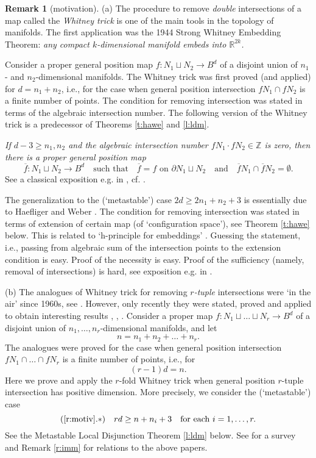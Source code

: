 \documentclass[12pt]{article}
\def\Z{{\mathbb Z}} \def\R{{\mathbb R}} \def\Q{{\mathbb Q}} \def\C{{\mathbb C}}
\theoremstyle{plain}
\theoremstyle{definition}
\newtheorem{Remark}[Theorem]{Remark}
\begin{document}
\begin{Remark}[motivation]\label{r:motiv}
(a) The procedure to remove {\it double} intersections of a map called the {\it Whitney trick}
is one of the main tools in the topology of manifolds.
The first application was the 1944 Strong Whitney Embedding Theorem:
{\it any compact $k$-dimensional manifold embeds into $\R^{2k}$.}

Consider a proper general position map $f:N_1\sqcup N_2\to B^d$ of a disjoint union of $n_1$- and $n_2$-dimensional manifolds.
The Whitney trick was first proved (and applied) for $d=n_1+n_2$, i.e., for the case when general position intersection $fN_1\cap fN_2$ is a finite number of points.
The condition for removing intersection was stated in terms of the algebraic intersection number.
The following version of the Whitney trick is a predecessor of Theorems \ref{t:hawe} and \ref{l:ldm}.

{\it If $d-3\ge n_1,n_2$ and the algebraic
intersection number $fN_1\cdot fN_2\in\Z$ is zero, then there is a proper general position map}
$$\overline f:N_1\sqcup N_2\to B^d\quad\text{such that}\quad \overline f=f\text{ on }
\partial N_1\sqcup N_2\quad\text{and}\quad \overline fN_1\cap \overline fN_2=\emptyset.$$
See a classical exposition e.g. in \cite[Whitney Lemma 5.12]{RS72}, cf. \cite{Skw}.

The generalization to the (`metastable') case $2d\ge2n_1+n_2+3$ is essentially due to Haefliger and Weber \cite{Ha63, We67}.
The condition for removing intersection was stated in terms of extension of certain map (of `configuration space'), see Theorem \ref{t:hawe} below.
This is related to `h-principle for embeddings' \cite[2.1.E]{Gr86}.
Guessing the statement, i.e., passing from algebraic sum of the intersection points to the extension condition is easy.
Proof of the necessity is easy.
Proof of the sufficiency (namely, removal of intersections) is hard, see exposition e.g. in \cite[\S8]{Sk06}.

(b) The analogues of Whitney trick for removing {\it $r$-tuple} intersections
were `in the air' since 1960s, see \cite[Remark 3.6]{Sk16}.
However, only recently they were stated, proved and applied to obtain interesting results
\cite{MW15, AMSW, MW16}, \cite[proof of Theorem 1.1 in pp. 7-8]{Me17}, \cite{Me18}.
Consider a proper map $f:N_1\sqcup\ldots\sqcup N_r\to B^d$ of a disjoint union of $n_1,\ldots,n_r$-dimensional manifolds, and let
$$n=n_1+n_2+\ldots+n_r.$$
The analogues were proved for the case when general position intersection $fN_1\cap\ldots\cap fN_r$
is a finite number of points, i.e., for
$$(r-1)d=n.$$
Here we prove and apply the $r$-fold Whitney trick when general position $r$-tuple intersection has positive dimension. More precisely, we consider the (`metastable') case
$$(\ref{r:motiv}.*)\quad rd\ge n+n_i+3\quad\text{for each }i=1,\ldots,r.$$
See the Metastable Local Disjunction Theorem \ref{l:ldm} below.
See \cite{Sk16} for a survey and Remark \ref{r:imm} for relations to the above papers.


\end{Remark}
\end{document}
